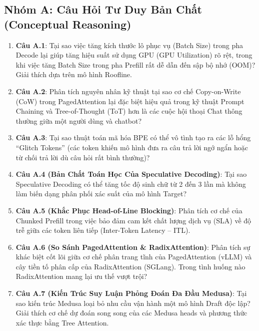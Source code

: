 \subsection{Nhóm A: Câu Hỏi Tư Duy Bản Chất (Conceptual Reasoning)}
\begin{enumerate}
  \item \textbf{Câu A.1}: Tại sao việc tăng kích thước lô phục vụ (Batch Size) trong pha Decode lại giúp tăng hiệu suất sử dụng GPU (GPU Utilization) rõ rệt, trong khi việc tăng Batch Size trong pha Prefill rất dễ dẫn đến sập bộ nhớ (OOM)? Giải thích dựa trên mô hình Roofline.
  \item \textbf{Câu A.2}: Phân tích nguyên nhân kỹ thuật tại sao cơ chế Copy-on-Write (CoW) trong PagedAttention lại đặc biệt hiệu quả trong kỹ thuật Prompt Chaining và Tree-of-Thought (ToT) hơn là các cuộc hội thoại Chat thông thường giữa một người dùng và chatbot?
  \item \textbf{Câu A.3}: Tại sao thuật toán mã hóa BPE có thể vô tình tạo ra các lỗ hổng ``Glitch Tokens'' (các token khiến mô hình đưa ra câu trả lời ngớ ngẩn hoặc từ chối trả lời dù câu hỏi rất bình thường)?
  \item \textbf{Câu A.4 (Bản Chất Toán Học Của Speculative Decoding)}: Tại sao Speculative Decoding có thể tăng tốc độ sinh chữ từ 2 đến 3 lần mà không làm biến dạng phân phối xác suất của mô hình Target?
  \item \textbf{Câu A.5 (Khắc Phục Head-of-Line Blocking)}: Phân tích cơ chế của Chunked Prefill trong việc bảo đảm cam kết chất lượng dịch vụ (SLA) về độ trễ giữa các token liên tiếp (Inter-Token Latency -- ITL).
  \item \textbf{Câu A.6 (So Sánh PagedAttention \& RadixAttention)}: Phân tích sự khác biệt cốt lõi giữa cơ chế phân trang tĩnh của PagedAttention (vLLM) và cây tiền tố phân cấp của RadixAttention (SGLang). Trong tình huống nào RadixAttention mang lại ưu thế vượt trội?
  \item \textbf{Câu A.7 (Kiến Trúc Suy Luận Phỏng Đoán Đa Đầu Medusa)}: Tại sao kiến trúc Medusa loại bỏ nhu cầu vận hành một mô hình Draft độc lập? Giải thích cơ chế dự đoán song song của các Medusa heads và phương thức xác thực bằng Tree Attention.
\end{enumerate}

